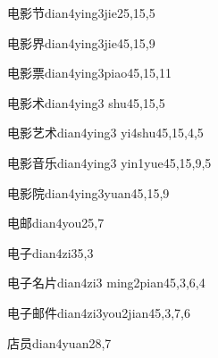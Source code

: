\begin{entry}{电影节}{dian4ying3jie2}{5,15,5}
\end{entry}

\begin{entry}{电影界}{dian4ying3jie4}{5,15,9}
\end{entry}

\begin{entry}{电影票}{dian4ying3piao4}{5,15,11}
\end{entry}

\begin{entry}{电影术}{dian4ying3 shu4}{5,15,5}
\end{entry}

\begin{entry}{电影艺术}{dian4ying3 yi4shu4}{5,15,4,5}
\end{entry}

\begin{entry}{电影音乐}{dian4ying3 yin1yue4}{5,15,9,5}
\end{entry}

\begin{entry}{电影院}{dian4ying3yuan4}{5,15,9}
\end{entry}

\begin{entry}{电邮}{dian4you2}{5,7}
\end{entry}

\begin{entry}{电子}{dian4zi3}{5,3}
\end{entry}

\begin{entry}{电子名片}{dian4zi3 ming2pian4}{5,3,6,4}
\end{entry}

\begin{entry}{电子邮件}{dian4zi3you2jian4}{5,3,7,6}
\end{entry}

\begin{entry}{店员}{dian4yuan2}{8,7}
\end{entry}

